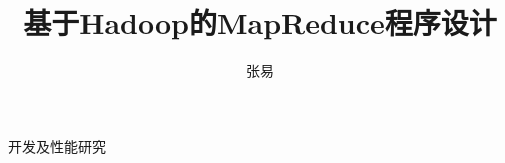 \documentclass[xetex]{XDBAthesis}
\begin{document}
	\title{基于Hadoop的MapReduce程序设计}{开发及性能研究}
    \author{张易}
    \maketitle

    \frontmatter
    
    \tableofcontents

    \mainmatter
    \pagestyle{content}
    
    
    
    
    

    \appendix
    

    \backmatter
    
    
\end{document}
